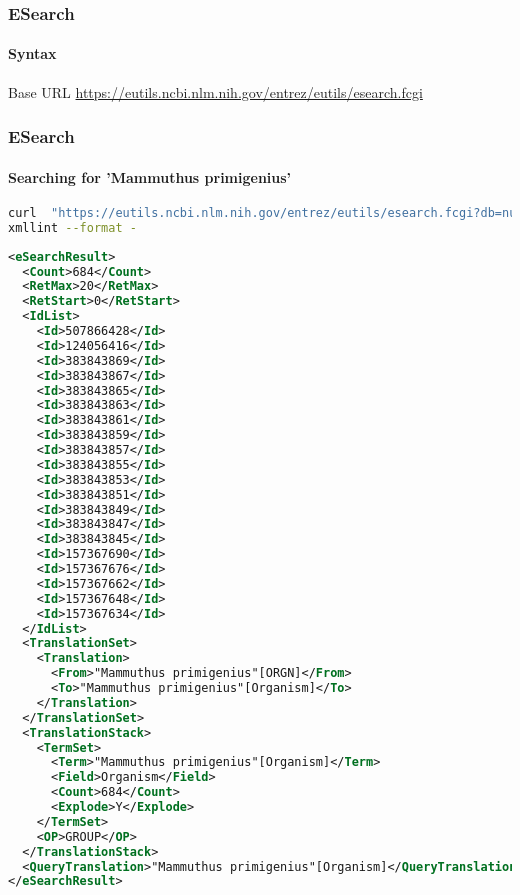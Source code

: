\documentclass{beamer}
\begin{document}
\begin{frame}[fragile]
\frametitle{ESearch}
\framesubtitle{Syntax}
Base URL
\url{https://eutils.ncbi.nlm.nih.gov/entrez/eutils/esearch.fcgi}
\end{frame}

\begin{frame}[fragile]
\frametitle{ESearch}
\framesubtitle{Searching for 'Mammuthus primigenius' }
\begin{lstlisting}[language=bash,basicstyle=\tiny,breaklines=true]
curl  "https://eutils.ncbi.nlm.nih.gov/entrez/eutils/esearch.fcgi?db=nucleotide&term=%22Mammuthus%20primigenius%22%5BORGN%5D" |\
xmllint --format -
\end{lstlisting}

\begin{lstlisting}[language=xml,basicstyle=\tiny,breaklines=false]
<eSearchResult>
  <Count>684</Count>
  <RetMax>20</RetMax>
  <RetStart>0</RetStart>
  <IdList>
    <Id>507866428</Id>
    <Id>124056416</Id>
    <Id>383843869</Id>
    <Id>383843867</Id>
    <Id>383843865</Id>
    <Id>383843863</Id>
    <Id>383843861</Id>
    <Id>383843859</Id>
    <Id>383843857</Id>
    <Id>383843855</Id>
    <Id>383843853</Id>
    <Id>383843851</Id>
    <Id>383843849</Id>
    <Id>383843847</Id>
    <Id>383843845</Id>
    <Id>157367690</Id>
    <Id>157367676</Id>
    <Id>157367662</Id>
    <Id>157367648</Id>
    <Id>157367634</Id>
  </IdList>
  <TranslationSet>
    <Translation>
      <From>"Mammuthus primigenius"[ORGN]</From>
      <To>"Mammuthus primigenius"[Organism]</To>
    </Translation>
  </TranslationSet>
  <TranslationStack>
    <TermSet>
      <Term>"Mammuthus primigenius"[Organism]</Term>
      <Field>Organism</Field>
      <Count>684</Count>
      <Explode>Y</Explode>
    </TermSet>
    <OP>GROUP</OP>
  </TranslationStack>
  <QueryTranslation>"Mammuthus primigenius"[Organism]</QueryTranslation>
</eSearchResult>
\end{lstlisting}
\end{frame}
\end{document}
